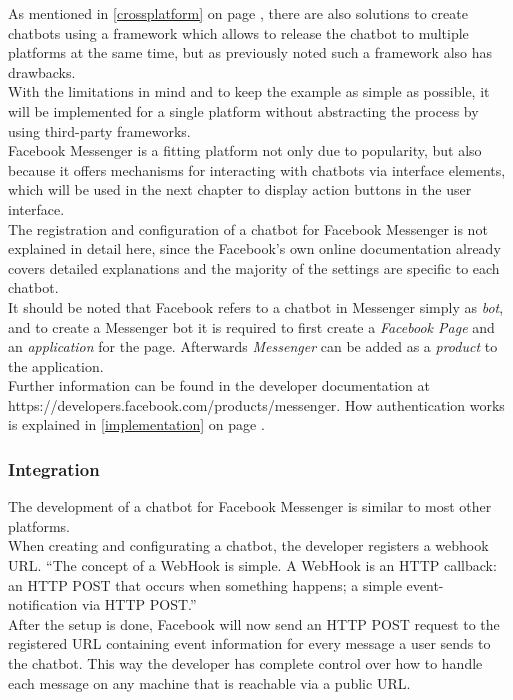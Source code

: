 As mentioned in \ref{crossplatform} on page \pageref{crossplatform}, there are also solutions to create chatbots using a framework which allows to release the chatbot to multiple platforms at the same time, but as previously noted such a framework also has drawbacks.
\\
With the limitations in mind and to keep the example as simple as possible,
it will be implemented for a single platform without abstracting the process by using third-party frameworks.
\\

Facebook Messenger is a fitting platform not only due to popularity,
but also because it offers mechanisms for interacting with chatbots via interface elements,
which will be used in the next chapter to display action buttons in the user interface.
\\

The registration and configuration of a chatbot for Facebook Messenger is not explained in detail here,
since the Facebook's own online documentation already covers detailed explanations
and the majority of the settings are specific to each chatbot.
\\
It should be noted that Facebook refers to a chatbot in Messenger simply as \emph{bot},
and to create a Messenger bot it is required to first create a \emph{Facebook Page} and an \emph{application} for the page.
Afterwards \emph{Messenger} can be added as a \emph{product} to the application.
\\
Further information can be found in the developer documentation at https://developers.facebook.com/products/messenger.
How authentication works is explained in \ref{implementation} on page \pageref{implementation}.


\subsubsection{Integration}

The development of a chatbot for Facebook Messenger is similar to most other platforms.
\\
When creating and configurating a chatbot, the developer registers a webhook URL.
``The concept of a WebHook is simple. A WebHook is an HTTP callback: an HTTP POST that occurs when something happens; a simple event-notification via HTTP POST.''\cite{webhook}
\\
After the setup is done,
Facebook will now send an HTTP POST request to the registered URL containing event information for every message a user sends to the chatbot.
This way the developer has complete control over how to handle each message on any machine that is reachable via a public URL.


